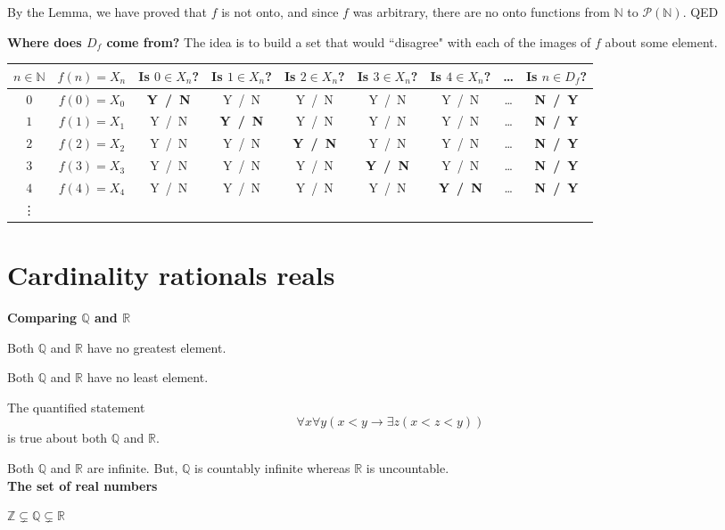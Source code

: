 \documentclass[12pt, oneside]{article}
\begin{document}
\vspace{50pt}

By  the Lemma, we  have proved that $f$ is not onto, and since $f$ was arbitrary, there are no onto
functions from $\mathbb{N}$ to $\mathcal{P}(\mathbb{N})$. QED


{\bf Where does $D_f$ come from?} The idea is to build a set that would ``disagree" with 
each of the images of $f$ about some element. 

\begin{center}
\begin{tabular}{c|c|ccccccc}
$n \in \mathbb{N}$ & $f(n) = X_n$ &  Is $0   \in X_n$?   & Is $1 \in X_n$?  &  Is $2 \in X_n$?  &  Is $3 \in X_n$?  &
 Is $4 \in X_n$?  &  \ldots & Is $n \in D_f$?\\
\hline
$0$ & $f(0) = X_0$ & {\bf  Y~/~N}  & Y~/~N & Y~/~N & Y~/~N &Y~/~N & \ldots & {\bf  N~/~Y }\\
$1$ & $f(1) = X_1$ & Y~/~N  & {\bf  Y~/~N} & Y~/~N & Y~/~N & Y~/~N & \ldots & {\bf  N~/~Y }\\
$2$ & $f(2) = X_2$ & Y~/~N  & Y~/~N & {\bf  Y~/~N} & Y~/~N &Y~/~N & \ldots & {\bf  N~/~Y }\\
$3$ & $f(3) = X_3$ & Y~/~N  & Y~/~N & Y~/~N & {\bf  Y~/~N} & Y~/~N & \ldots & {\bf  N~/~Y }\\
$4$ & $f(4) = X_4$ & Y~/~N  & Y~/~N & Y~/~N & Y~/~N &{\bf  Y~/~N} & \ldots & {\bf  N~/~Y }\\
\vdots
\end{tabular}
\end{center} \vfill
\section*{Cardinality rationals reals}


{\bf Comparing $\mathbb{Q}$ and $\mathbb{R}$} 


Both $\mathbb{Q}$ and $\mathbb{R}$ have no greatest element.

Both $\mathbb{Q}$ and $\mathbb{R}$ have no least element.

The quantified statement 
\[
    \forall x \forall y (x < y \to \exists z ( x < z < y) )
\]
is true about both $\mathbb{Q}$ and $\mathbb{R}$.

Both $\mathbb{Q}$ and $\mathbb{R}$ are infinite. But, $\mathbb{Q}$ is countably infinite
whereas $\mathbb{R}$ is uncountable.\\


{\bf The set of real numbers}

$\mathbb{Z} \subsetneq \mathbb{Q} \subsetneq \mathbb{R}$
\end{document}
